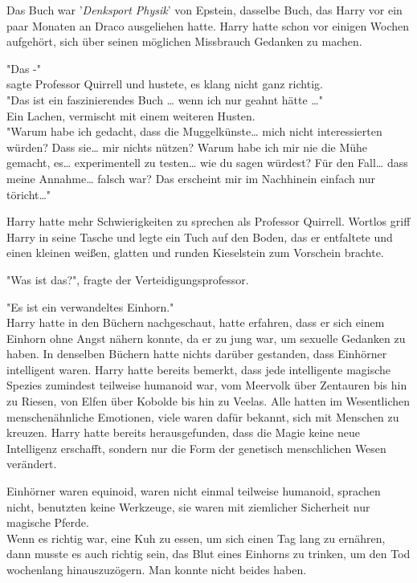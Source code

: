 {Das Buch war '\emph{Denksport Physik}' von Epstein, dasselbe Buch, das Harry vor ein paar Monaten an Draco ausgeliehen hatte. Harry hatte schon vor einigen Wochen aufgehört, sich über seinen möglichen Missbrauch Gedanken zu machen.

"Das -"\\ sagte Professor Quirrell und hustete, es klang nicht ganz richtig.\\ "Das ist ein faszinierendes Buch … wenn ich nur geahnt hätte …"\\ Ein Lachen, vermischt mit einem weiteren Husten.\\ "Warum habe ich gedacht, dass die Muggelkünste… mich nicht interessierten würden? Dass sie… mir nichts nützen? Warum habe ich mir nie die Mühe gemacht, es… experimentell zu testen… wie du sagen würdest? Für den Fall… dass meine Annahme… falsch war? Das erscheint mir im Nachhinein einfach nur töricht…"

Harry hatte mehr Schwierigkeiten zu sprechen als Professor Quirrell. Wortlos griff Harry in seine Tasche und legte ein Tuch auf den Boden, das er entfaltete und einen kleinen weißen, glatten und runden Kieselstein zum Vorschein brachte.

"Was ist das?", fragte der Verteidigungsprofessor.

"Es ist ein verwandeltes Einhorn."\\ Harry hatte in den Büchern nachgeschaut, hatte erfahren, dass er sich einem Einhorn ohne Angst nähern konnte, da er zu jung war, um sexuelle Gedanken zu haben. In denselben Büchern hatte nichts darüber gestanden, dass Einhörner intelligent waren. Harry hatte bereits bemerkt, dass jede intelligente magische Spezies zumindest teilweise humanoid war, vom Meervolk über Zentauren bis hin zu Riesen, von Elfen über Kobolde bis hin zu Veelas. Alle hatten im Wesentlichen menschenähnliche Emotionen, viele waren dafür bekannt, sich mit Menschen zu kreuzen. Harry hatte bereits herausgefunden, dass die Magie keine neue Intelligenz erschafft, sondern nur die Form der genetisch menschlichen Wesen verändert.

Einhörner waren equinoid, waren nicht einmal teilweise humanoid, sprachen nicht, benutzten keine Werkzeuge, sie waren mit ziemlicher Sicherheit nur magische Pferde.\\ Wenn es richtig war, eine Kuh zu essen, um sich einen Tag lang zu ernähren, dann musste es auch richtig sein, das Blut eines Einhorns zu trinken, um den Tod wochenlang hinauszuzögern. Man konnte nicht beides haben.

}

